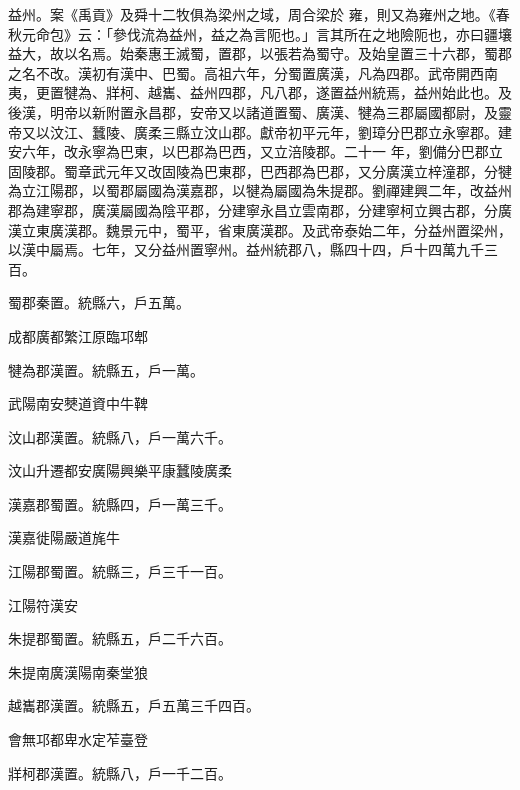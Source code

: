 \begin{pinyinscope}
 益州。案《禹貢》及舜十二牧俱為梁州之域，周合梁於
 雍，則又為雍州之地。《春秋元命包》云：「參伐流為益州，益之為言阨也。」言其所在之地險阨也，亦曰疆壤益大，故以名焉。始秦惠王滅蜀，置郡，以張若為蜀守。及始皇置三十六郡，蜀郡之名不改。漢初有漢中、巴蜀。高祖六年，分蜀置廣漢，凡為四郡。武帝開西南夷，更置犍為、牂柯、越巂、益州四郡，凡八郡，遂置益州統焉，益州始此也。及後漢，明帝以新附置永昌郡，安帝又以諸道置蜀、廣漢、犍為三郡屬國都尉，及靈帝又以汶江、蠶陵、廣柔三縣立汶山郡。獻帝初平元年，劉璋分巴郡立永寧郡。建安六年，改永寧為巴東，以巴郡為巴西，又立涪陵郡。二十一
 年，劉備分巴郡立固陵郡。蜀章武元年又改固陵為巴東郡，巴西郡為巴郡，又分廣漢立梓潼郡，分犍為立江陽郡，以蜀郡屬國為漢嘉郡，以犍為屬國為朱提郡。劉禪建興二年，改益州郡為建寧郡，廣漢屬國為陰平郡，分建寧永昌立雲南郡，分建寧柯立興古郡，分廣漢立東廣漢郡。魏景元中，蜀平，省東廣漢郡。及武帝泰始二年，分益州置梁州，以漢中屬焉。七年，又分益州置寧州。益州統郡八，縣四十四，戶十四萬九千三百。



 蜀郡秦置。統縣六，戶五萬。



 成都廣都繁江原臨邛郫



 犍為郡漢置。統縣五，戶一萬。



 武陽南安僰道資中牛鞞



 汶山郡漢置。統縣八，戶一萬六千。



 汶山升遷都安廣陽興樂平康蠶陵廣柔



 漢嘉郡蜀置。統縣四，戶一萬三千。



 漢嘉徙陽嚴道旄牛



 江陽郡蜀置。統縣三，戶三千一百。



 江陽符漢安



 朱提郡蜀置。統縣五，戶二千六百。



 朱提南廣漢陽南秦堂狼



 越巂郡漢置。統縣五，戶五萬三千四百。



 會無邛都卑水定苲臺登



 牂柯郡漢置。統縣八，戶一千二百。




\end{pinyinscope}
